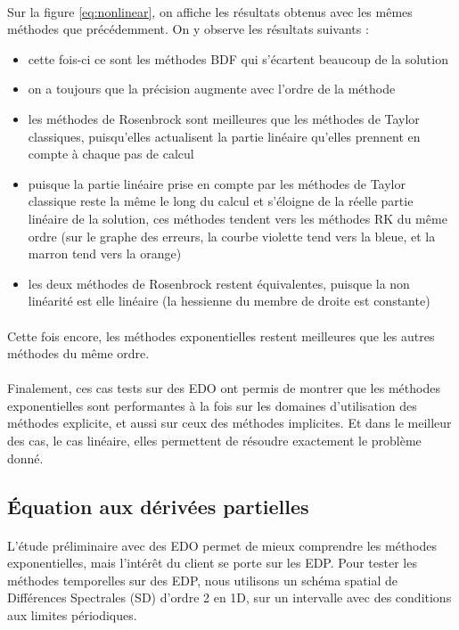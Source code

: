     \paragraph{}
    Sur la figure \ref{eq:nonlinear}, on affiche les résultats obtenus avec les mêmes méthodes que précédemment. On y observe les résultats suivants :
    \begin{itemize}
        \item cette fois-ci ce sont les méthodes BDF qui s'écartent beaucoup de la solution
        \item on a toujours que la précision augmente avec l'ordre de la méthode
        \item les méthodes de Rosenbrock sont meilleures que les méthodes de Taylor classiques, puisqu'elles actualisent la partie linéaire qu'elles prennent en compte à chaque pas de calcul
        \item puisque la partie linéaire prise en compte par les méthodes de Taylor classique reste la même le long du calcul et s'éloigne de la réelle partie linéaire de la solution, ces méthodes tendent vers les méthodes RK du même ordre (sur le graphe des erreurs, la courbe violette tend vers la bleue, et la marron tend vers la orange)
        \item les deux méthodes de Rosenbrock restent équivalentes, puisque la non linéarité est elle linéaire (la hessienne du membre de droite est constante)
    \end{itemize}
    \paragraph{}
    Cette fois encore, les méthodes exponentielles restent meilleures que les autres méthodes du même ordre.
    
    \paragraph{}
    Finalement, ces cas tests sur des EDO ont permis de montrer que les méthodes exponentielles sont performantes à la fois sur les domaines d'utilisation des méthodes explicite, et aussi sur ceux des méthodes implicites. Et dans le meilleur des cas, le cas linéaire, elles permettent de résoudre exactement le problème donné.
    
	
\subsection{Équation aux dérivées partielles}
    \paragraph{}
    L'étude préliminaire avec des EDO permet de mieux comprendre les méthodes exponentielles, mais l'intérêt du client se porte sur les EDP. Pour tester les méthodes temporelles sur des EDP, nous utilisons un schéma spatial de Différences Spectrales (SD) d'ordre 2 en 1D, sur un intervalle avec des conditions aux limites périodiques.

